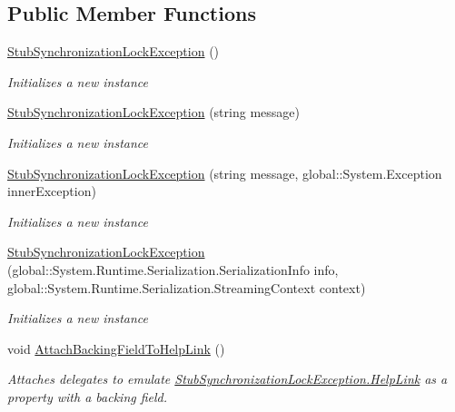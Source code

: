 \subsection*{Public Member Functions}
\begin{DoxyCompactItemize}
\item 
\hyperlink{class_system_1_1_threading_1_1_fakes_1_1_stub_synchronization_lock_exception_ab1bed43a6ed99b5d491c5ebab46e24b4}{Stub\-Synchronization\-Lock\-Exception} ()
\begin{DoxyCompactList}\small\item\em Initializes a new instance\end{DoxyCompactList}\item 
\hyperlink{class_system_1_1_threading_1_1_fakes_1_1_stub_synchronization_lock_exception_a448d6f835da5cc844802c8da6cd7b805}{Stub\-Synchronization\-Lock\-Exception} (string message)
\begin{DoxyCompactList}\small\item\em Initializes a new instance\end{DoxyCompactList}\item 
\hyperlink{class_system_1_1_threading_1_1_fakes_1_1_stub_synchronization_lock_exception_acbb9001f44cbfdd826501fb9f98db85d}{Stub\-Synchronization\-Lock\-Exception} (string message, global\-::\-System.\-Exception inner\-Exception)
\begin{DoxyCompactList}\small\item\em Initializes a new instance\end{DoxyCompactList}\item 
\hyperlink{class_system_1_1_threading_1_1_fakes_1_1_stub_synchronization_lock_exception_ad22995fb4ec30f3bd1ac39f7423d5c8a}{Stub\-Synchronization\-Lock\-Exception} (global\-::\-System.\-Runtime.\-Serialization.\-Serialization\-Info info, global\-::\-System.\-Runtime.\-Serialization.\-Streaming\-Context context)
\begin{DoxyCompactList}\small\item\em Initializes a new instance\end{DoxyCompactList}\item 
void \hyperlink{class_system_1_1_threading_1_1_fakes_1_1_stub_synchronization_lock_exception_a9c877d3398be6ece4115bbfd900ed124}{Attach\-Backing\-Field\-To\-Help\-Link} ()
\begin{DoxyCompactList}\small\item\em Attaches delegates to emulate \hyperlink{class_system_1_1_threading_1_1_fakes_1_1_stub_synchronization_lock_exception_adcb3fe5ac1dd1636abfa17c160c64f3c}{Stub\-Synchronization\-Lock\-Exception.\-Help\-Link} as a property with a backing field.\end{DoxyCompactList}\item 

\end{DoxyCompactItemize}

